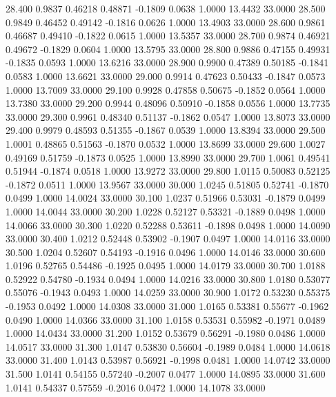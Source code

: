   28.400   0.9837   0.46218   0.48871  -0.1809   0.0638   1.0000  13.4432  33.0000
  28.500   0.9849   0.46452   0.49142  -0.1816   0.0626   1.0000  13.4903  33.0000
  28.600   0.9861   0.46687   0.49410  -0.1822   0.0615   1.0000  13.5357  33.0000
  28.700   0.9874   0.46921   0.49672  -0.1829   0.0604   1.0000  13.5795  33.0000
  28.800   0.9886   0.47155   0.49931  -0.1835   0.0593   1.0000  13.6216  33.0000
  28.900   0.9900   0.47389   0.50185  -0.1841   0.0583   1.0000  13.6621  33.0000
  29.000   0.9914   0.47623   0.50433  -0.1847   0.0573   1.0000  13.7009  33.0000
  29.100   0.9928   0.47858   0.50675  -0.1852   0.0564   1.0000  13.7380  33.0000
  29.200   0.9944   0.48096   0.50910  -0.1858   0.0556   1.0000  13.7735  33.0000
  29.300   0.9961   0.48340   0.51137  -0.1862   0.0547   1.0000  13.8073  33.0000
  29.400   0.9979   0.48593   0.51355  -0.1867   0.0539   1.0000  13.8394  33.0000
  29.500   1.0001   0.48865   0.51563  -0.1870   0.0532   1.0000  13.8699  33.0000
  29.600   1.0027   0.49169   0.51759  -0.1873   0.0525   1.0000  13.8990  33.0000
  29.700   1.0061   0.49541   0.51944  -0.1874   0.0518   1.0000  13.9272  33.0000
  29.800   1.0115   0.50083   0.52125  -0.1872   0.0511   1.0000  13.9567  33.0000
  30.000   1.0245   0.51805   0.52741  -0.1870   0.0499   1.0000  14.0024  33.0000
  30.100   1.0237   0.51966   0.53031  -0.1879   0.0499   1.0000  14.0044  33.0000
  30.200   1.0228   0.52127   0.53321  -0.1889   0.0498   1.0000  14.0066  33.0000
  30.300   1.0220   0.52288   0.53611  -0.1898   0.0498   1.0000  14.0090  33.0000
  30.400   1.0212   0.52448   0.53902  -0.1907   0.0497   1.0000  14.0116  33.0000
  30.500   1.0204   0.52607   0.54193  -0.1916   0.0496   1.0000  14.0146  33.0000
  30.600   1.0196   0.52765   0.54486  -0.1925   0.0495   1.0000  14.0179  33.0000
  30.700   1.0188   0.52922   0.54780  -0.1934   0.0494   1.0000  14.0216  33.0000
  30.800   1.0180   0.53077   0.55076  -0.1943   0.0493   1.0000  14.0259  33.0000
  30.900   1.0172   0.53230   0.55375  -0.1953   0.0492   1.0000  14.0308  33.0000
  31.000   1.0165   0.53381   0.55677  -0.1962   0.0490   1.0000  14.0366  33.0000
  31.100   1.0158   0.53531   0.55982  -0.1971   0.0489   1.0000  14.0434  33.0000
  31.200   1.0152   0.53679   0.56291  -0.1980   0.0486   1.0000  14.0517  33.0000
  31.300   1.0147   0.53830   0.56604  -0.1989   0.0484   1.0000  14.0618  33.0000
  31.400   1.0143   0.53987   0.56921  -0.1998   0.0481   1.0000  14.0742  33.0000
  31.500   1.0141   0.54155   0.57240  -0.2007   0.0477   1.0000  14.0895  33.0000
  31.600   1.0141   0.54337   0.57559  -0.2016   0.0472   1.0000  14.1078  33.0000
